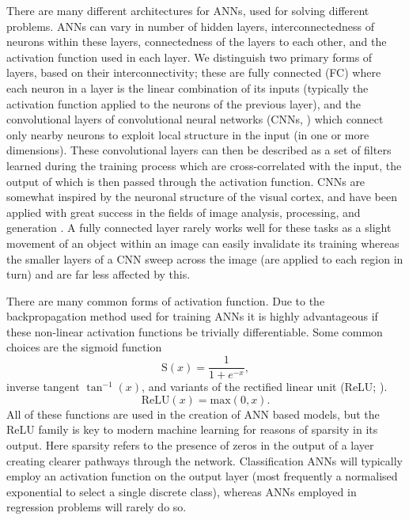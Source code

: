 There are many different architectures for ANNs, used for solving different problems.
ANNs can vary in number of hidden layers, interconnectedness of neurons within these layers, connectedness of the layers to each other, and the activation function used in each layer.
We distinguish two primary forms of layers, based on their interconnectivity; these are fully connected (FC) where each neuron in a layer is the linear combination of its inputs (typically the activation function applied to the neurons of the previous layer), and the convolutional layers of convolutional neural networks (CNNs, \citet{1998Lecun,2003Simard}) which connect only nearby neurons to exploit local structure in the input (in one or more dimensions).
These convolutional layers can then be described as a set of filters learned during the training process which are cross-correlated with the input, the output of which is then passed through the activation function.
CNNs are somewhat inspired by the neuronal structure of the visual cortex, and have been applied with great success in the fields of image analysis, processing, and generation \citep{Raschka2015}.
A fully connected layer rarely works well for these tasks as a slight movement of an object within an image can easily invalidate its training whereas the smaller layers of a CNN sweep across the image (are applied to each region in turn) and are far less affected by this.

There are many common forms of activation function.
Due to the backpropagation method used for training ANNs it is highly advantageous if these non-linear activation functions be trivially differentiable.
Some common choices are the sigmoid function
\begin{equation}
    \mathrm{S}(x) = \frac{1}{1+e^{-x}},
\end{equation}
inverse tangent $\tan^{-1}(x)$, and variants of the rectified linear unit (ReLU; \citet{2010Nair}).
\begin{equation}
    \mathrm{ReLU}(x) = \mathrm{max}(0, x).
\end{equation}
All of these functions are used in the creation of ANN based models, but the ReLU family is key to modern machine learning for reasons of sparsity in its output.
Here sparsity refers to the presence of zeros in the output of a layer creating clearer pathways through the network.
Classification ANNs will typically employ an activation function on the output layer (most frequently a normalised exponential to select a single discrete class), whereas ANNs employed in regression problems will rarely do so.

